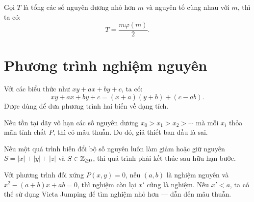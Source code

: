 \documentclass[../imo-training-open-book.tex]{subfiles}
\begin{document}
\begin{theorem*}
    \label{theorem:sum-coprime-m}
    Gọi \( T \) là tổng các số nguyên dương nhỏ hơn \( m \) và nguyên tố cùng nhau với \( m \), thì ta có:
    \[
        T = \frac{m\varphi(m)}{2}.
    \]
\end{theorem*}

\newpage

\section{Phương trình nghiệm nguyên}

\begin{theorem}
    \label{theorem:simon-trick}
    Với các biểu thức như \( xy + ax + by + c \), ta có:
    \[
        xy + ax + by + c = (x + a)(y + b) + (c - ab).
    \]
    Được dùng để đưa phương trình hai biến về dạng tích.
\end{theorem}

\vspace{1em}

\begin{lemma}
    \label{lemma:infinite-descent}
    Nếu tồn tại dãy vô hạn các số nguyên dương \( x_0 > x_1 > x_2 > \cdots \) mà mỗi \( x_i \) thỏa mãn tính chất \( P \), thì có mâu thuẫn. Do đó, giả thiết ban đầu là sai.
\end{lemma}

\vspace{1em}

\begin{theorem}[Monovariant \( S = |x| + |y| + |z| \)]
    \label{theorem:monovariant-absolute-sum}
    Nếu một quá trình biến đổi bộ số nguyên luôn làm giảm hoặc giữ nguyên \( S = |x| + |y| + |z| \) và \( S \in \mathbb Z_{\ge 0} \), thì quá trình phải kết thúc sau hữu hạn bước.
\end{theorem}

\vspace{1em}

\begin{theorem}
    \label{theorem:vieta-jumping}
    Với phương trình đối xứng \( P(x, y) = 0 \), nếu \( (a, b) \) là nghiệm nguyên và \( x^2 - (a + b)x + ab = 0 \), thì nghiệm còn lại \( x' \) cũng là nghiệm. Nếu \( x' < a \), ta có thể sử dụng Vieta Jumping để tìm nghiệm nhỏ hơn — dẫn đến mâu thuẫn.
\end{theorem}
\end{document}
